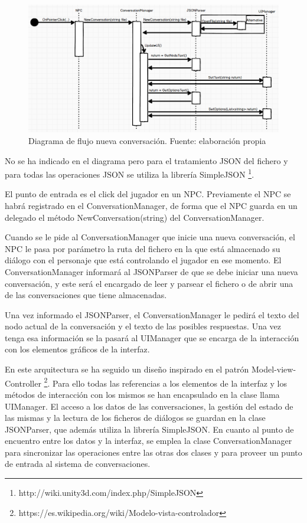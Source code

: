 \begin{figure}
\begin{center}
\includegraphics[scale=0.55]{imagenes/nuevaConversFlujo.png}
\caption{Diagrama de flujo nueva conversación.  Fuente: elaboración propia}
\label{nuevaConversFlujo}
\end{center}
\end{figure}

No se ha indicado en el diagrama pero para el tratamiento JSON del fichero y para todas las operaciones JSON se utiliza la librería SimpleJSON \footnote{http://wiki.unity3d.com/index.php/SimpleJSON}.


El punto de entrada es el click del jugador en un NPC. Previamente el NPC se habrá registrado en el ConversationManager, de forma que el NPC guarda en un delegado el método NewConversation(string) del ConversationManager.

Cuando se le pide al ConversationManager que inicie una nueva conversación, el NPC le pasa por parámetro la ruta del fichero en la que está almacenado su diálogo con el personaje que está controlando el jugador en ese momento. El ConversationManager informará al JSONParser de que se debe iniciar una nueva conversación, y este será el encargado de leer y parsear el fichero o de abrir una de las conversaciones que tiene almacenadas.

Una vez informado el JSONParser, el ConversationManager le pedirá el texto del nodo actual de la conversación y el texto de las posibles respuestas. Una vez tenga esa información se la pasará al UIManager que se encarga de la interacción con los elementos gráficos de la interfaz.

En este arquitectura se ha seguido un diseño inspirado en el patrón Model-view-Controller \footnote{https://es.wikipedia.org/wiki/Modelo-vista-controlador}. Para ello todas las referencias a los elementos de la interfaz y los métodos de interacción con los mismos se han encapsulado en la clase llama UIManager. El acceso a los datos de las conversaciones, la gestión del estado de las mismas y la lectura de los ficheros de diálogos se guardan en la clase JSONParser, que además utiliza la librería SimpleJSON. En cuanto al punto de encuentro entre los datos y la interfaz, se emplea la clase ConversationManager para sincronizar las operaciones entre las otras dos clases y para proveer un punto de entrada al sistema de conversaciones.

